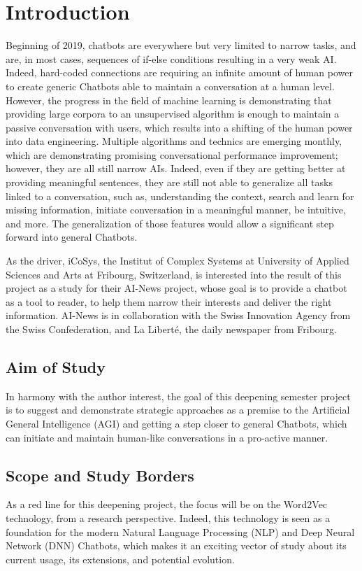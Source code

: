 \chapter{Introduction}
\label{chap:introduction}

Beginning of 2019, chatbots are everywhere but very limited to narrow tasks, and are, in most cases, sequences of if-else conditions resulting in a very weak AI. Indeed, hard-coded connections are requiring an infinite amount of human power to create generic Chatbots able to maintain a conversation at a human level. However, the progress in the field of machine learning is demonstrating that providing large corpora to an unsupervised algorithm is enough to maintain a passive conversation with users, which results into a shifting of the human power into data engineering. Multiple algorithms and technics are emerging monthly, which are demonstrating promising conversational performance improvement; however, they are all still narrow AIs. Indeed, even if they are getting better at providing meaningful sentences, they are still not able to generalize all tasks linked to a conversation, such as, understanding the context, search and learn for missing information, initiate conversation in a meaningful manner, be intuitive, and more. The generalization of those features would allow a significant step forward into general Chatbots.

As the driver, iCoSys, the Institut of Complex Systems at University of Applied Sciences and Arts at Fribourg, Switzerland, is interested into the result of this project as a study for their AI-News project, whose goal is to provide a chatbot as a tool to reader, to help them narrow their interests and deliver the right information. AI-News is in collaboration with the Swiss Innovation Agency from the Swiss Confederation, and La Liberté, the daily newspaper from Fribourg. 

\section{Aim of Study}
In harmony with the author interest, the goal of this deepening semester project is to suggest and demonstrate strategic approaches as a premise to the Artificial General Intelligence (AGI) and getting a step closer to general Chatbots, which can initiate and maintain human-like conversations in a pro-active manner.

\section{Scope and Study Borders}
As a red line for this deepening project, the focus will be on the Word2Vec technology, from a research perspective. Indeed, this technology is seen as a foundation for the modern Natural Language Processing (NLP) and Deep Neural Network (DNN) Chatbots, which makes it an exciting vector of study about its current usage, its extensions, and potential evolution. 